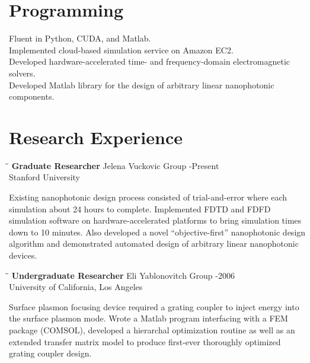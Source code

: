 \documentclass{res}
\begin{document}
\begin{resume}
\section{Programming}          
    Fluent in Python, CUDA, and Matlab. \\
    Implemented cloud-based simulation service on Amazon EC2. \\
    Developed hardware-accelerated time- and frequency-domain
        electromagnetic solvers. \\
    Developed Matlab library for the design of arbitrary linear nanophotonic components.

\section{Research Experience}
   \vspace{-0.1in}	
   \begin{tabbing}
   \hspace{2.3in}\= \hspace{2.6in}\= \kill %
    {\bf Graduate Researcher} \>Jelena Vuckovic Group -Present\\
                             \>Stanford University
   \end{tabbing}\vspace{-20pt}      %
    Existing nanophotonic design process consisted of trial-and-error
        where each simulation about 24 hours to complete.
    Implemented FDTD and FDFD simulation software on hardware-accelerated platforms 
    to bring simulation times down to 10 minutes.
    Also developed a novel ``objective-first'' nanophotonic design algorithm
        and demonstrated automated design of arbitrary linear nanophotonic 
        devices.
   \begin{tabbing}
   \hspace{2.3in}\= \hspace{2.6in}\= \kill %
    {\bf Undergraduate Researcher} \>Eli Yablonovitch Group -2006\\
                          \>University of California, Los Angeles
   \end{tabbing}\vspace{-20pt}
    Surface plasmon focusing device required a grating coupler to inject energy
        into the surface plasmon mode.
    Wrote a Matlab program interfacing with a FEM package (COMSOL),
        developed a hierarchal optimization routine as well as an extended 
        transfer matrix model to produce first-ever thoroughly optimized 
        grating coupler design.
   
\end{resume}
\end{document}
